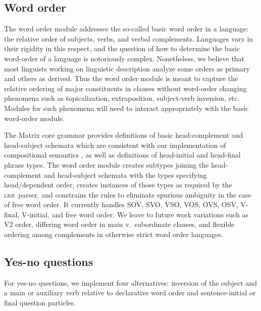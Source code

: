 \documentclass[11pt]{article}
\newcommand{\hpsg}{\textsc{hpsg}}
\newcommand{\lkb}{\textsc{lkb}}
\begin{document}
\subsection{Word order}

The word order module addresses the so-called basic word order in a
language: the relative order of subjects, verbs, and verbal
complements.  Languages vary in their rigidity in this respect, 
and the question of how to determine the basic word-order of a
language is notoriously complex.  Nonetheless, we believe that most
linguists working on linguistic description analyze some orders
as primary and others as derived.  Thus the word order module is
meant to capture the relative ordering
of major constituents in clauses without
word-order changing phenomena such as topicalization,
extraposition, subject-verb inversion, etc.
Modules for such phenomena will need to interact
appropriately with the basic word-order module.

The Matrix core grammar provides definitions of basic head-complement
and head-subject schemata which are consistent with our
implementation of compositional semantics \cite{Fli:Ben:03}, as well
as definitions of head-initial and head-final phrase types.  
The word order module
creates subtypes joining the head-complement and
head-subject schemata with the types specifying head/dependent
order, creates instances of those types as required by
the \lkb\ parser, and constrains the rules to eliminate spurious ambiguity in the case of
free word order.  It currently handles SOV, SVO,
VSO, VOS, OVS, OSV, V-final, V-initial, and free word order.  We leave
to future work variations such as V2 order, differing word order
in main v.\ subordinate clauses, 
and flexible ordering among
complements in otherwise strict word order languages.  

\subsection{Yes-no questions}

For yes-no questions, we implement four alternatives:
inversion of the subject and a main or auxiliary verb relative
to declarative word order and sentence-initial
or final question particles.
\end{document}
